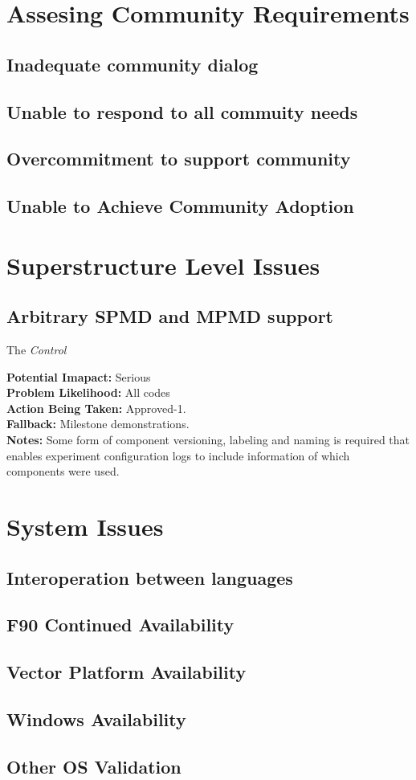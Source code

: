 \documentclass[english]{article}
\newcommand{\req}[1]{\section{\hspace{.2in}#1}}
\newcommand{\sreq}[1]{\subsection{\hspace{.2in}#1}}
\newenvironment
{reqlist}
{\begin{list} {} {} \rm \item[]}
{\end{list}}
\begin{document}




\newpage
\tableofcontents

\newpage

\req{Assesing Community Requirements}
\sreq{Inadequate community dialog}
\sreq{Unable to respond to all commuity needs}
\sreq{Overcommitment to support community}
\sreq{Unable to Achieve Community Adoption}

\req{Superstructure Level Issues}
\sreq{Arbitrary SPMD and MPMD support}
The {\it Control}
\begin{reqlist}
{\bf Potential Imapact:} Serious \\
{\bf Problem Likelihood:} All codes\\
{\bf Action Being Taken:} Approved-1. \\
{\bf Fallback:} Milestone demonstrations.\\
{\bf Notes:} Some form of component versioning, labeling and naming
is required that enables experiment configuration logs
to include information of which components were used.
\end{reqlist}

\req{System Issues}
\sreq{Interoperation between languages}
\sreq{F90 Continued Availability}
\sreq{Vector Platform Availability}
\sreq{Windows Availability}
\sreq{Other OS Validation}
\end{document}
